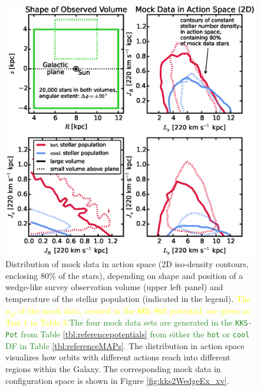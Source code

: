 \documentclass[iop,revtex4,numberedappendix,appendixfloats]{emulateapj}
\newcommand{\pmodel}{\ensuremath{p_M}}
\newcommand{\NEW}[1]{\textcolor{ForestGreen}{#1}}
\newcommand{\OLD}[1]{\textcolor{Yellow}{#1}}%
\begin{document}
\begin{figure}[!htbp]
\centering
\begin{minipage}{0.48\textwidth}
\centering
\includegraphics[width=\textwidth]{figs/kks2WedgeEx_mockdata_actions.eps}
\caption{Distribution of mock data in action space (2D iso-density contours, enclosing 80\% of the stars), depending on shape and position of a wedge-like survey observation volume (upper left panel) and temperature of the stellar population (indicated in the legend). \OLD{The \pmodel{} of the mock data, created in the \texttt{KKS-Pot} potential, are given as Test 1 in Table 3.}\NEW{The four mock data sets are generated in the \texttt{KKS-Pot} from Table \ref{tbl:referencepotentials} from either the \texttt{hot} or \texttt{cool} DF in Table \ref{tbl:referenceMAPs}.} The distribution in action space visualizes how orbits with different actions reach into different regions within the Galaxy. The corresponding mock data in configuration space is shown in Figure \ref{fig:kks2WedgeEx_xv}.} 
\label{fig:kks2WedgeEx_actions}
\end{minipage}
\hfill
\begin{minipage}{0.48\textwidth}
\centering

\end{minipage}
\end{figure}
\end{document}
